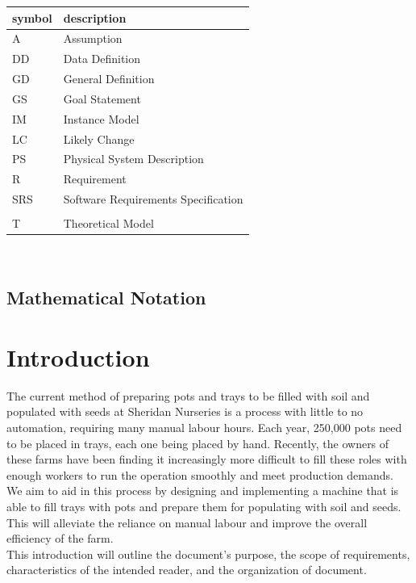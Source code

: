 \documentclass[12pt]{article}
\begin{document}
\renewcommand{\arraystretch}{1.2}
\begin{tabular}{l l} 
  \toprule		
  \textbf{symbol} & \textbf{description}\\
  \midrule 
  A & Assumption\\
  DD & Data Definition\\
  GD & General Definition\\
  GS & Goal Statement\\
  IM & Instance Model\\
  LC & Likely Change\\
  PS & Physical System Description\\
  R & Requirement\\
  SRS & Software Requirements Specification\\
  \progname{} & \\
  T & Theoretical Model\\
  \bottomrule
\end{tabular}\\

\subsection{Mathematical Notation}

\newpage



\section{Introduction}

The current method of preparing pots and trays to be filled with soil and populated with seeds at Sheridan Nurseries is a process with little to no automation, requiring many manual labour hours. Each year, 250,000 pots need to be placed in trays, each one being placed by hand. Recently, the owners of these farms have been finding it increasingly more difficult to fill these roles with enough workers to run the operation smoothly and meet production demands.\\

\noindent We aim to aid in this process by designing and implementing a machine that is able to fill trays with pots and prepare them for populating with soil and seeds. This will alleviate the reliance on manual labour and improve the overall efficiency of the farm. \\

\noindent This introduction will outline the document’s purpose, the scope of requirements, characteristics of the intended reader, and the organization of document. 
\end{document}
